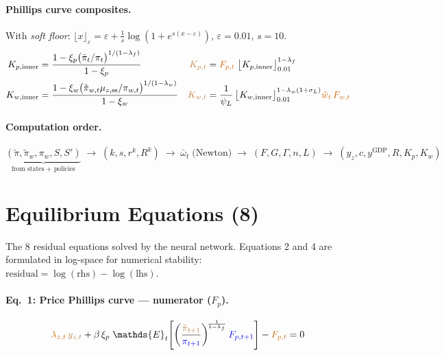 \documentclass[11pt]{article}
\begin{document}
\paragraph{Phillips curve composites.}
With \emph{soft floor}: $\lfloor x \rfloor_\varepsilon = \varepsilon + \frac{1}{s}\log(1+e^{s(x-\varepsilon)})$,\;
$\varepsilon = 0.01$, $s=10$.
\begin{align*}
  K_{p,\text{inner}} &= \frac{1 - \xi_p\bigl(\tilde\pi_t/\pi_t\bigr)^{1/(1-\lambda_f)}}{1-\xi_p}
  &
  \textcolor{brown}{K_{p,t}} &= \textcolor{orange!80!black}{F_{p,t}}\;
    \bigl\lfloor K_{p,\text{inner}} \bigr\rfloor_{0.01}^{1-\lambda_f}
  \\
  K_{w,\text{inner}} &= \frac{1 - \xi_w\bigl(\tilde\pi_{w,t}\mu_{z,\text{ss}}/\pi_{w,t}\bigr)^{1/(1-\lambda_w)}}{1-\xi_w}
  &
  \textcolor{brown}{K_{w,t}} &= \frac{1}{\psi_L}\,
    \bigl\lfloor K_{w,\text{inner}} \bigr\rfloor_{0.01}^{1-\lambda_w(1+\sigma_L)}
    \textcolor{orange!80!black}{\tilde{w}_t}\,\textcolor{orange!80!black}{F_{w,t}}
\end{align*}

\paragraph{Computation order.}
\begin{equation*}
  \underbrace{(\tilde\pi,\tilde\pi_w,\pi_w,S,S')}_{\text{from states + policies}}
  \;\to\; (k, s, r^k, R^k)
  \;\to\; \bar\omega_t\;\text{(Newton)}
  \;\to\; (F, G, \Gamma, n, L)
  \;\to\; (y_z, c, y^{\text{GDP}}, R, K_p, K_w)
\end{equation*}


\section{Equilibrium Equations (8)}
\label{sec:equations}

The 8 residual equations solved by the neural network. Equations 2 and 4
are formulated in log-space for numerical stability:
$\text{residual} = \log(\text{rhs}) - \log(\text{lhs})$.

\setcounter{equation}{0}

\paragraph{Eq.~1: Price Phillips curve --- numerator ($F_p$).}
\begin{equation}
  \textcolor{orange!80!black}{\lambda_{z,t}}\,\textcolor{brown}{y_{z,t}}
  + \beta\,\xi_p\;\mathds{E}_t\!\left[
    \left(\frac{\textcolor{brown}{\tilde\pi_{t+1}}}{\textcolor{blue}{\pi_{t+1}}}\right)^{\!\frac{1}{1-\lambda_f}}
    \textcolor{blue}{F_{p,t+1}}
  \right]
  - \textcolor{orange!80!black}{F_{p,t}} = 0
\end{equation}
\end{document}
